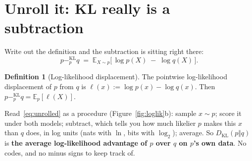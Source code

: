 \documentclass[11pt,oneside]{book}
\newcommand{\kl}[1]{\mathbin{-^{\mathrm{KL}}_{#1}}}       %
\newcommand{\DKL}{D_{\mathrm{KL}}}
\newcommand{\E}{\mathbb{E}}
\theoremstyle{definition}
\newtheorem{definition}{Definition}[chapter]
\theoremstyle{plain}
\theoremstyle{remark}
\begin{document}
\section{Unroll it: KL really is a subtraction}

Write out the definition and the subtraction is sitting right there:
\begin{equation}\label{eq:unrolled}
p\kl{p}q\;=\;\E_{X\sim p}\big[\,\log p(X)\;-\;\log q(X)\,\big].
\end{equation}

\begin{definition}[Log-likelihood displacement]
The pointwise log-likelihood displacement of $p$ from $q$ is $\ell(x):=\log p(x)-\log q(x)$.
Then $p\kl{p}q=\E_p[\ell(X)]$.
\end{definition}

Read~\eqref{eq:unrolled} as a procedure (Figure~\ref{fig:loglik}b): sample $x\sim p$; score it under both models;
subtract, which tells you how much likelier $p$ makes this $x$ than $q$ does, in log units (nats with $\ln$, bits
with $\log_2$); average. So $\DKL(p\Vert q)$ is \textbf{the average log-likelihood advantage of $p$ over $q$ on $p$'s
own data}. No codes, and no minus signs to keep track of.
\end{document}
